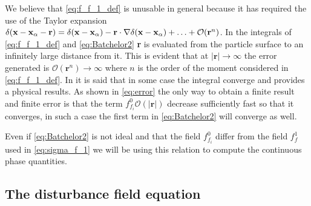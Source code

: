 We believe that \ref{eq:f_f_1_def} is unusable in general because it has required the use of the Taylor expansion $\delta(\textbf{x} - \textbf{x}_\alpha - \textbf{r}) =\delta(\textbf{x} - \textbf{x}_\alpha) - \textbf{r}\cdot \mathbf{\nabla}\delta(\textbf{x} - \textbf{x}_\alpha)+ \ldots + \mathcal{O}(\textbf{r}^n)$. 
In the integrals of \ref{eq:f_f_1_def} and \ref{eq:Batchelor2} \textbf{r} is evaluated from the particle surface to an infinitely large distance from it.
This is evident that at $|\textbf{r}| \to \infty$ the error generated is $\mathcal{O}(\textbf{r}^n) \to\infty$ where $n$ is the order of the moment considered in \ref{eq:f_f_1_def}. 
In  \citet{batchelor1972sedimentation} it is said that in some case the integral converge and provides a physical results. 
As shown in \ref{eq:error} the only way to obtain a finite result and finite error is that the term $f_{f_i}^0\mathcal{O}(|\textbf{r}|)$ decrease sufficiently fast so that it converges, in such a case the first term in \ref{eq:Batchelor2} will converge as well.  

Even if \ref{eq:Batchelor2} is not ideal and that the field $f_{f_i}^0$ differ from the field $f_f^1$ used in \ref{eq:sigma_f_1} we will be using this relation to compute the continuous phase quantities. 

\subsection{The disturbance field equation}

